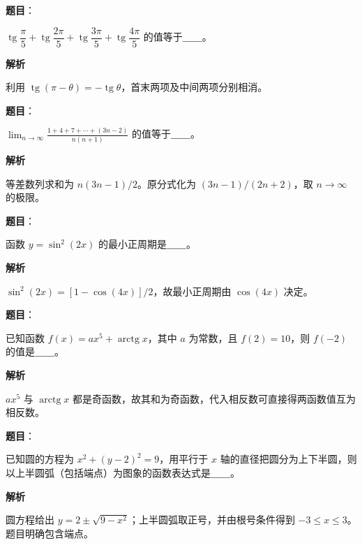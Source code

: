 \begin{answer}

\textbf{题目}：

$\operatorname{tg}\dfrac\pi5+\operatorname{tg}\dfrac{2\pi}5+\operatorname{tg}\dfrac{3\pi}5+\operatorname{tg}\dfrac{4\pi}5$ 的值等于＿＿。

\textbf{解析}

利用 $\operatorname{tg}(\pi-\theta)=-\operatorname{tg}\theta$，首末两项及中间两项分别相消。


\end{answer}
\begin{answer}

\textbf{题目}：

$\displaystyle\lim_{n\to\infty}\frac{1+4+7+\cdots +(3n-2)}{n(n+1)}$ 的值等于＿＿。

\textbf{解析}

等差数列求和为 $n(3n-1)/2$。原分式化为 $(3n-1)/(2n+2)$，取 $n\to\infty$ 的极限。


\end{answer}
\begin{answer}

\textbf{题目}：

函数 $y=\sin^2(2x)$ 的最小正周期是＿＿。

\textbf{解析}

$\sin^2(2x)=[1-\cos(4x)]/2$，故最小正周期由 $\cos(4x)$ 决定。


\end{answer}
\begin{answer}

\textbf{题目}：

已知函数 $f(x)=ax^5+\operatorname{arctg}x$，其中 $a$ 为常数，且 $f(2)=10$，则 $f(-2)$ 的值是＿＿。

\textbf{解析}

$ax^5$ 与 $\operatorname{arctg}x$ 都是奇函数，故其和为奇函数，代入相反数可直接得两函数值互为相反数。


\end{answer}
\begin{answer}

\textbf{题目}：

已知圆的方程为 $x^2+(y-2)^2=9$，用平行于 $x$ 轴的直径把圆分为上下半圆，则以上半圆弧（包括端点）为图象的函数表达式是＿＿。

\textbf{解析}

圆方程给出 $y=2\pm\sqrt{9-x^2}$；上半圆弧取正号，并由根号条件得到 $-3\le x\le3$。题目明确包含端点。


\end{answer}
